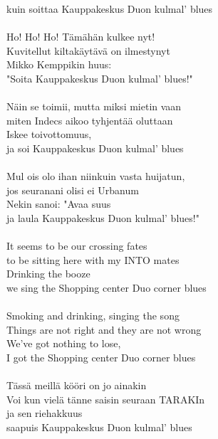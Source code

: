 kuin soittaa Kauppakeskus Duon kulmal' blues \\
\hspace{10mm} \\
Ho! Ho! Ho! Tämähän kulkee nyt! \\
Kuvitellut kiltakäytävä on ilmestynyt \\
Mikko Kemppikin huus: \\
"Soita Kauppakeskus Duon kulmal' blues!" \\
\hspace{10mm} \\
Näin se toimii, mutta miksi mietin vaan \\
miten Indecs aikoo tyhjentää oluttaan \\
Iskee toivottomuus, \\
ja soi Kauppakeskus Duon kulmal' blues \\
\hspace{10mm} \\
Mul ois olo ihan niinkuin vasta huijatun, \\
jos seuranani olisi ei Urbanum \\
Nekin sanoi: "Avaa suus \\
ja laula Kauppakeskus Duon kulmal' blues!" \\
\hspace{10mm} \\
It seems to be our crossing fates \\
to be sitting here with my INTO mates \\
Drinking the booze \\
we sing the Shopping center Duo corner blues \\
\hspace{10mm} \\
Smoking and drinking, singing the song \\
Things are not right and they are not wrong \\
We've got nothing to lose, \\
I got the Shopping center Duo corner blues \\
\hspace{10mm} \\
Tässä meillä kööri on jo ainakin \\
Voi kun vielä tänne saisin seuraan TARAKIn \\
ja sen riehakkuus \\
saapuis Kauppakeskus Duon kulmal' blues \\
\hspace{10mm} \\
